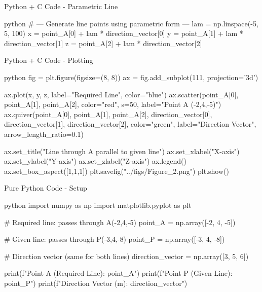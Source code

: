 \documentclass{beamer}
\begin{document}
\begin{frame}[fragile]{Python + C Code - Parametric Line}
\begin{mintedbox}[fontsize=\scriptsize]{python}
# --- Generate line points using parametric form ---
lam = np.linspace(-5, 5, 100)
x = point_A[0] + lam * direction_vector[0]
y = point_A[1] + lam * direction_vector[1]
z = point_A[2] + lam * direction_vector[2]
\end{mintedbox}
\end{frame}

\begin{frame}[fragile]{Python + C Code - Plotting}
\begin{mintedbox}[fontsize=\scriptsize]{python}
fig = plt.figure(figsize=(8, 8))
ax = fig.add_subplot(111, projection='3d')

ax.plot(x, y, z, label="Required Line", color="blue")
ax.scatter(point_A[0], point_A[1], point_A[2],
           color="red", s=50, label="Point A (-2,4,-5)")
ax.quiver(point_A[0], point_A[1], point_A[2],
          direction_vector[0], direction_vector[1], direction_vector[2],
          color="green", label="Direction Vector", arrow_length_ratio=0.1)

ax.set_title("Line through A parallel to given line")
ax.set_xlabel("X-axis")
ax.set_ylabel("Y-axis")
ax.set_zlabel("Z-axis")
ax.legend()
ax.set_box_aspect([1,1,1])
plt.savefig("../figs/Figure_2.png")
plt.show()
\end{mintedbox}
\end{frame}

\begin{frame}[fragile]{Pure Python Code - Setup}
\begin{mintedbox}[fontsize=\scriptsize]{python}
import numpy as np
import matplotlib.pyplot as plt

# Required line: passes through A(-2,4,-5)
point_A = np.array([-2, 4, -5])

# Given line: passes through P(-3,4,-8)
point_P = np.array([-3, 4, -8])

# Direction vector (same for both lines)
direction_vector = np.array([3, 5, 6])

print(f"Point A (Required Line): {point_A}")
print(f"Point P (Given Line): {point_P}")
print(f"Direction Vector (m): {direction_vector}")


\end{mintedbox}
\end{frame}
\end{document}
